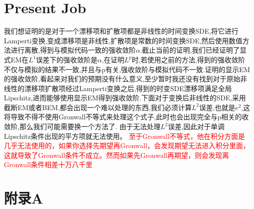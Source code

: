 \documentclass[12pt,final]{article}
\numberwithin{equation}{section}
\numberwithin{figure}{section}
\numberwithin{table}{section}
\theoremstyle{plain}
\theoremstyle{definition}
\theoremstyle{remark}
\begin{document}
	\section{Present Job}
	我们想证明的是对于一个漂移项和扩散项都是非线性的时间变换SDE,将它进行Lamperti变换,变成漂移项是非线性,扩散项是常数的时间变换SDE,然后使用数值方法进行离散,得到与模拟代码一致的强收敛阶$\alpha$.截止当前的证明,我们已经证明了显式EM在$L^1$误差下的强收敛阶是$\alpha$,在证明$L^p$时,若使用之前的方法,得到的强收敛阶不仅与模拟的结果不一致,并且与p有关,强收敛阶与模拟代码不一致.证明的显示EM的强收敛阶,看起来对我们的预期没有什么意义,至少暂时我还没有找到对于原始非线性的漂移项扩散项经过Lamperti变换之后,得到的时变SDE漂移项满足全局Lipschitz,进而能够使用显示EM得到强收敛阶.下面对于变换后非线性的SDE,采用截断EM或者BEM,都会出现一个难以处理的东西,我们必须计算$L^2$误差,也就是$e^2$,这将导致不得不使用Gronwall不等式来处理这个式子,此时也会出现完全与p相关的收敛阶,那么我们可能需要换一个方法了.
	由于无法处理$L^2$误差,因此对于单调Lipschitz条件出现的平方项就无法使用。
	\textcolor{red}{至于Gronwall不等式，他在积分方面是几乎无法使用的，如果你选择先期望再Gronwall，会发现期望无法进入积分里面，这就导致了Gronwall条件不成立。然而如果先Gronwall再期望，则会发现离Gronwall条件相差十万八千里}
	\appendix
	\renewcommand{\appendixname}{附录} %
	
	\section{附录A}\label{appendix A}
	
	
	
	
	
	
	
	
	
\end{document}

